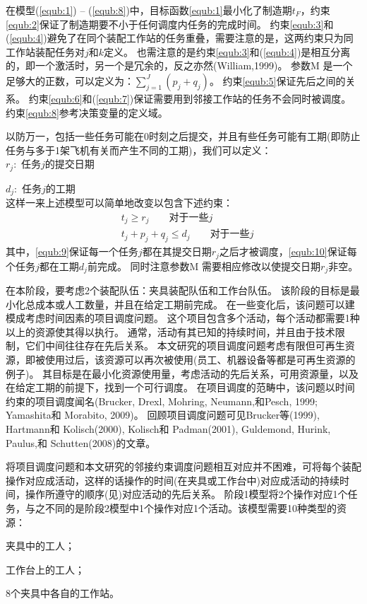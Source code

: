 在模型(\ref{equb:1}) -- (\ref{equb:8})中，目标函数\eqref{equb:1}最小化了制造期$t_F$，约束\eqref{equb:2}保证了制造期要不小于任何调度内任务的完成时间。
约束\eqref{equb:3}和(\ref{equb:4})避免了在同个装配工作站的任务重叠，需要注意的是，这两约束只为同工作站装配任务对$j$和$k$定义。
也需注意的是约束\eqref{equb:3}和(\ref{equb:4})是相互分离的，即一个激活时，另一个是冗余的，反之亦然(William,1999)。
参数M 是一个足够大的正数，可以定义为：$\sum_{j=1}^J(p_j + q_j)$。
约束\eqref{equb:5}保证先后之间的关系。
约束\eqref{equb:6}和(\ref{equb:7})保证需要用到邻接工作站的任务不会同时被调度。
约束\eqref{equb:8}参考决策变量的定义域。

以防万一，包括一些任务可能在0时刻之后提交，并且有些任务可能有工期(即防止任务与多于1架飞机有关而产生不同的工期)，我们可以定义：\\[3pt]
\indent $r_j:$ 任务$j$的提交日期

$d_j:$ 任务$j$的工期\\
这样一来上述模型可以简单地改变以包含下述约束：
\begin{align}
&\label{equb:9} t_j \geqslant r_j \qquad \text{对于一些$j$}\\
&\label{equb:10} t_j + p_j + q_j \leqslant d_j \qquad \text{对于一些$j$}
\end{align}
其中，\eqref{equb:9}保证每一个任务$j$都在其提交日期$r_j$之后才被调度，\eqref{equb:10}保证每个任务$j$都在工期$d_j$前完成。
同时注意参数M 需要相应修改以使提交日期$r_j$非空。

在本阶段，要考虑2个装配队伍：夹具装配队伍和工作台队伍。
该阶段的目标是最小化总成本或人工数量，并且在给定工期前完成。
在一些变化后，该问题可以建模成考虑时间因素的项目调度问题。
这个项目包含多个活动，每个活动都需要1种以上的资源使其得以执行。
通常，活动有其已知的持续时间，并且由于技术限制，它们中间往往存在先后关系。
本文研究的项目调度问题考虑有限但可再生资源，即被使用过后，该资源可以再次被使用(员工、机器设备等都是可再生资源的例子)。
其目标是在最小化资源使用量，考虑活动的先后关系，可用资源量，以及在给定工期的前提下，找到一个可行调度。
在项目调度的范畴中，该问题以时间约束的项目调度闻名(Brucker, Drexl, Mohring, Neumann,和Pesch, 1999; Yamashita和 Morabito, 2009)。
回顾项目调度问题可见Brucker等(1999), Hartmann和 Kolisch(2000), Kolisch和 Padman(2001), Guldemond, Hurink, Paulus,和 Schutten(2008)的文章。

将项目调度问题和本文研究的邻接约束调度问题相互对应并不困难，可将每个装配操作对应成活动，这样的话操作的时间(在夹具或工作台中)对应成活动的持续时间，操作所遵守的顺序(见)对应活动的先后关系。
阶段1模型将2个操作对应1个任务，与之不同的是阶段2模型中1个操作对应1个活动。该模型需要10种类型的资源：
\begin{asparaenum}[(a)]
\item 夹具中的工人；
\item 工作台上的工人；
\item 8个夹具中各自的工作站。
\end{asparaenum}

